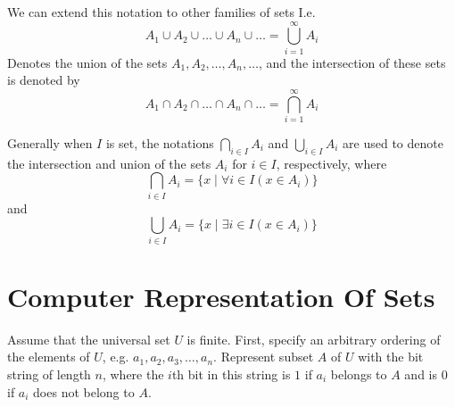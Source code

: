 \documentclass[12pt letter]{report}
\begin{document}



We can extend this notation to other families of sets I.e.
\[
  A_1 \cup A_2 \cup \ldots \cup A_n \cup \ldots = \bigcup_{i = 1} ^{\infty}A_i
\]
Denotes the union of the sets $A_1,A_2,\ldots,A_n,\ldots$, and the intersection of these sets is denoted by
\[
  A_1 \cap A_2 \cap \ldots \cap A_n \cap \ldots = \bigcap_{i = 1} ^{\infty}A_i
\]

Generally when $I$ is set, the notations $\bigcap_{i \in  I}A_i $ and $\bigcup_{i \in  I}A_i $ are used to denote the
intersection and union of the sets $A_i$ for $i \in I$, respectively, where
\[
  \bigcap_{i \in  I} A_i = \{x  \mid \forall i \in I \left( x \in A_i \right) \}
\]
and
\[
  \bigcup_{i \in  I}  A_i = \{x  \mid \exists i \in I \left( x \in A_i \right) \}
\]


\section{Computer Representation Of Sets}

Assume that the universal set $U$ is finite. First, specify an arbitrary ordering of the elements of $U$, e.g. $a_1, a_2,
  a_3, \ldots,a_n$. Represent subset $A$ of $U$ with the bit string of length $n$, where the $i$th bit in this string is
$1$ if $a_i$ belongs to $A$ and is $0$ if $a_i$ does not belong to $A$.
\end{document}
